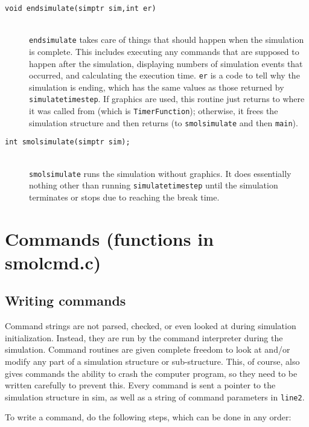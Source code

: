 \documentclass {scrbook}
\newcommand {\ttt} {\texttt}
\begin{document}
\begin{description}
\item[\ttt{void endsimulate(simptr sim,int er)}]
\hfill \\
\ttt{endsimulate} takes care of things that should happen when the simulation is complete. This includes executing any commands that are supposed to happen after the simulation, displaying numbers of simulation events that occurred, and calculating the execution time. \ttt{er} is a code to tell why the simulation is ending, which has the same values as those returned by \ttt{simulatetimestep}. If graphics are used, this routine just returns to where it was called from (which is \ttt{TimerFunction}); otherwise, it frees the simulation structure and then returns (to \ttt{smolsimulate} and then \ttt{main}).

\item[\ttt{int smolsimulate(simptr sim);}]
\hfill \\
\ttt{smolsimulate} runs the simulation without graphics. It does essentially nothing other than running \ttt{simulatetimestep} until the simulation terminates or stops due to reaching the break time.

\end{description}

\section{Commands (functions in smolcmd.c)}

\subsection*{Writing commands}

Command strings are not parsed, checked, or even looked at during simulation initialization. Instead, they are run by the command interpreter during the simulation. Command routines are given complete freedom to look at and/or modify any part of a simulation structure or sub-structure. This, of course, also gives commands the ability to crash the computer program, so they need to be written carefully to prevent this. Every command is sent a pointer to the simulation structure in sim, as well as a string of command parameters in \ttt{line2}.

To write a command, do the following steps, which can be done in any order:
\end{document}
